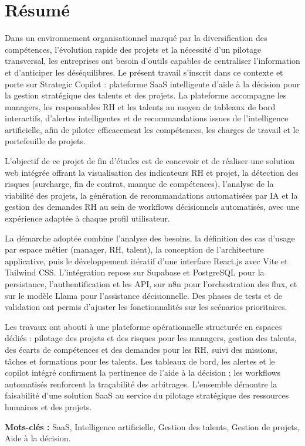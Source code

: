 \chapter*{Résumé}

Dans un environnement organisationnel marqué par la diversification des compétences, l'évolution rapide des projets et la nécessité d'un pilotage transversal, les entreprises ont besoin d'outils capables de centraliser l'information et d'anticiper les déséquilibres. Le présent travail s'inscrit dans ce contexte et porte sur Strategic Copilot : plateforme SaaS intelligente d'aide à la décision pour la gestion stratégique des talents et des projets. La plateforme accompagne les managers, les responsables RH et les talents au moyen de tableaux de bord interactifs, d'alertes intelligentes et de recommandations issues de l'intelligence artificielle, afin de piloter efficacement les compétences, les charges de travail et le portefeuille de projets.

L'objectif de ce projet de fin d'études est de concevoir et de réaliser une solution web intégrée offrant la visualisation des indicateurs RH et projet, la détection des risques (surcharge, fin de contrat, manque de compétences), l'analyse de la viabilité des projets, la génération de recommandations automatisées par IA et la gestion des demandes RH au sein de workflows décisionnels automatisés, avec une expérience adaptée à chaque profil utilisateur.

La démarche adoptée combine l'analyse des besoins, la définition des cas d'usage par espace métier (manager, RH, talent), la conception de l'architecture applicative, puis le développement itératif d'une interface React.js avec Vite et Tailwind CSS. L'intégration repose sur Supabase et PostgreSQL pour la persistance, l'authentification et les API, sur n8n pour l'orchestration des flux, et sur le modèle Llama pour l'assistance décisionnelle. Des phases de tests et de validation ont permis d'ajuster les fonctionnalités sur les scénarios prioritaires.

Les travaux ont abouti à une plateforme opérationnelle structurée en espaces dédiés : pilotage des projets et des risques pour les managers, gestion des talents, des écarts de compétences et des demandes pour les RH, suivi des missions, tâches et formations pour les talents. Les tableaux de bord, les alertes et le copilot intégré confirment la pertinence de l'aide à la décision ; les workflows automatisés renforcent la traçabilité des arbitrages. L'ensemble démontre la faisabilité d'une solution SaaS au service du pilotage stratégique des ressources humaines et des projets.

\textbf{Mots-clés :} SaaS, Intelligence artificielle, Gestion des talents, Gestion de projets, Aide à la décision.

\clearpage
